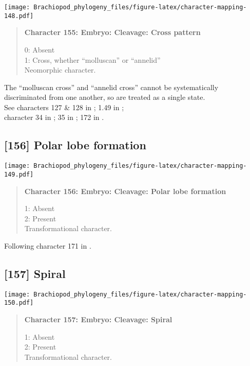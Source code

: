 \documentclass[openany]{book}
\theoremstyle{definition}
\theoremstyle{definition}
\theoremstyle{definition}
\theoremstyle{remark}
\begin{document}
\texttt{[image: Brachiopod\_phylogeny\_files/figure-latex/character-mapping-148.pdf]}

\begin{quote}
\textbf{Character 155: Embryo: Cleavage: Cross pattern}

0: Absent\\
1: Cross, whether ``molluscan'' or ``annelid''\\
Neomorphic character.
\end{quote}

The ``molluscan cross'' and ``annelid cross'' cannot be systematically
discriminated from one another, so are treated as a single state.\\
See characters 127 \& 128 in \citet{Rouse1999}; 1.49 in
\citet{SPS1996};\\
character 34 in \citet{Haszprunar1996}; 35 in \citet{Haszprunar2000};
172 in \citet{Giribet2002}.

\subsection*{{[}156{]} Polar lobe formation}\label{polar-lobe-formation}

\texttt{[image: Brachiopod\_phylogeny\_files/figure-latex/character-mapping-149.pdf]}

\begin{quote}
\textbf{Character 156: Embryo: Cleavage: Polar lobe formation}

1: Absent\\
2: Present\\
Transformational character.
\end{quote}

Following character 171 in \citet{Giribet2002}.

\subsection*{{[}157{]} Spiral}\label{spiral}

\texttt{[image: Brachiopod\_phylogeny\_files/figure-latex/character-mapping-150.pdf]}

\begin{quote}
\textbf{Character 157: Embryo: Cleavage: Spiral}

1: Absent\\
2: Present\\
Transformational character.
\end{quote}
\end{document}
